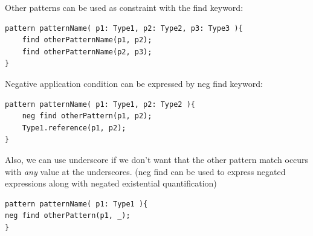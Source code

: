 \begin{minipage}{\textwidth}
Other patterns can be used as constraint with the find keyword:
\begin{lstlisting}[language=vql]
pattern patternName( p1: Type1, p2: Type2, p3: Type3 ){
	find otherPatternName(p1, p2);
	find otherPatternName(p2, p3);
}
\end{lstlisting}
\end{minipage}
\vspace{\belowdisplayskip}

\begin{minipage}{\textwidth}
Negative application condition can be expressed by neg find keyword:
\begin{lstlisting}[language=vql]
pattern patternName( p1: Type1, p2: Type2 ){
	neg find otherPattern(p1, p2);
	Type1.reference(p1, p2);
}
\end{lstlisting}
\vspace{\belowdisplayskip}

Also, we can use underscore if we don't want that the other pattern match occurs with \emph{any} value at the underscores. (neg find can be used to express negated expressions along with negated existential quantification)

\begin{lstlisting}[language=vql]
pattern patternName( p1: Type1 ){
neg find otherPattern(p1, _);
}
\end{lstlisting}
\end{minipage}
\vspace{\belowdisplayskip}
